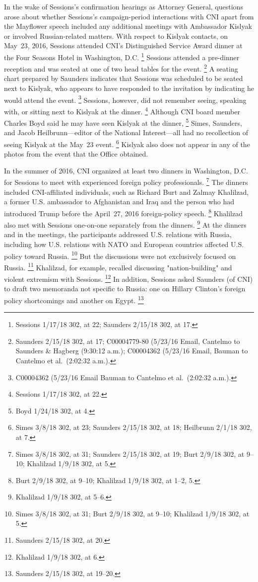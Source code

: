 In the wake of Sessions's confirmation hearings as Attorney General, questions arose about whether Sessions's campaign-period interactions with CNI apart from the Mayflower speech included any additional meetings with Ambassador Kislyak or involved Russian-related matters.
With respect to Kislyak contacts, on May~23, 2016, Sessions attended CNI's Distinguished Service Award dinner at the Four Seasons Hotel in Washington, D.C.%
\footnote{Sessions 1/17/18 302, at 22;
Saunders 2/15/18 302, at 17.}
Sessions attended a pre-dinner reception and was seated at one of two head tables for the event.%
\footnote{Saunders 2/15/18 302, at 17;
C00004779-80 (5/23/16 Email, Cantelmo to Saunders \& Hagberg (9:30:12 a.m.);
C00004362 (5/23/16 Email, Bauman to Cantelmo et al.\ (2:02:32 a.m.).}
A seating chart prepared by Saunders indicates that Sessions was scheduled to be seated next to Kislyak, who appears to have responded to the invitation by indicating he would attend the event.%
\footnote{C00004362 (5/23/16 Email Bauman to Cantelmo et al.\ (2:02:32 a.m.).}
Sessions, however, did not remember seeing, speaking with, or sitting next to Kislyak at the dinner.%
\footnote{Sessions 1/17/18 302, at 22.}
Although CNI board member Charles Boyd said he may have seen Kislyak at the dinner,%
\footnote{Boyd 1/24/18 302, at 4.}
Simes, Saunders, and Jacob Heilbrunn---editor of the National Interest---all had no recollection of seeing Kislyak at the May~23 event.%
\footnote{Simes 3/8/18 302, at 23;
Saunders 2/15/18 302, at 18;
Heilbrunn 2/1/18 302, at 7.}
Kislyak also does not appear in any of the photos from the event that the Office obtained.

In the summer of 2016, CNI organized at least two dinners in Washington, D.C. for Sessions to meet with experienced foreign policy professionals.%
\footnote{Simes 3/8/18 302, at 31;
Saunders 2/15/18 302, at 19;
Burt 2/9/18 302, at 9--10;
Khalilzad 1/9/18 302, at 5.}
The dinners included CNI-affiliated individuals, such as Richard Burt and Zalmay Khalilzad, a former U.S. ambassador to Afghanistan and Iraq and the person who had introduced Trump before the April~27, 2016 foreign-policy speech.%
\footnote{Burt 2/9/18 302, at 9--10;
Khalilzad 1/9/18 302, at 1--2, 5.}
Khalilzad also met with Sessions one-on-one separately from the dinners.%
\footnote{Khalilzad 1/9/18 302, at 5--6.}
At the dinners and in the meetings, the participants addressed U.S. relations with Russia, including how U.S. relations with NATO and European countries affected U.S. policy toward Russia.%
\footnote{Simes 3/8/18 302, at 31;
Burt 2/9/18 302, at 9--10;
Khalilzad 1/9/18 302, at 5.}
But the discussions were not exclusively focused on Russia.%
\footnote{Saunders 2/15/18 302, at 20.}
Khalilzad, for example, recalled discussing "nation-building" and violent extremism with Sessions.%
\footnote{Khalilzad 1/9/18 302, at 6.}
In addition, Sessions asked Saunders (of CNI) to draft two memoranda not specific to Russia: one on Hillary Clinton's foreign policy shortcomings and another on Egypt.%
\footnote{Saunders 2/15/18 302, at 19--20.}

